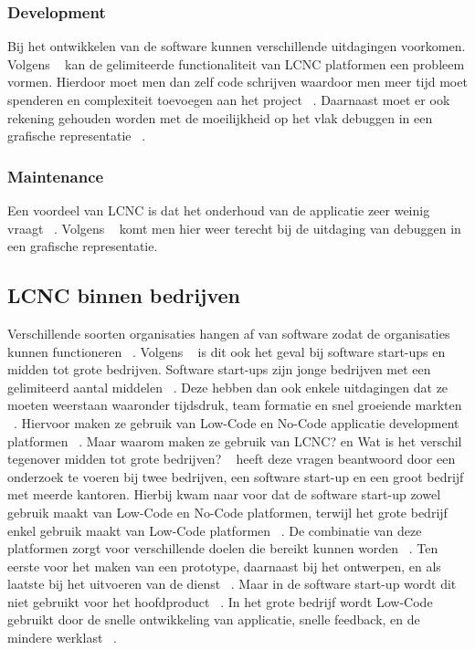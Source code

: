 \subsubsection*{Development}
\label{sub:development}
Bij het ontwikkelen van de software kunnen verschillende uitdagingen voorkomen.
Volgens ~\textcite{Rokis_2022} kan de gelimiteerde functionaliteit van LCNC platformen een probleem vormen.
Hierdoor moet men dan zelf code schrijven waardoor men meer tijd moet spenderen en complexiteit toevoegen aan het project ~\autocite{Rokis_2022}.
Daarnaast moet er ook rekening gehouden worden met de moeilijkheid op het vlak debuggen in een grafische representatie ~\autocite{Rokis_2022}.
\subsubsection*{Maintenance}
\label{sub:maintenance}
Een voordeel van LCNC is dat het onderhoud van de applicatie zeer weinig vraagt ~\autocite{Rokis_2022}.
Volgens ~\textcite{Rokis_2022} komt men hier weer terecht bij de uitdaging van debuggen in een grafische representatie.

\subsection*{LCNC binnen bedrijven}
\label{sub:lcnc-binnen-bedrijven}
Verschillende soorten organisaties hangen af van software zodat de organisaties kunnen functioneren ~\autocite{Hintsch2021}.
Volgens ~\textcite{Rafiq_2022} is dit ook het geval bij software start-ups en midden tot grote bedrijven. 
Software start-ups zijn jonge bedrijven met een gelimiteerd aantal middelen ~\autocite{Rafiq_2022}. 
Deze hebben dan ook enkele uitdagingen dat ze moeten weerstaan waaronder tijdsdruk, team formatie en snel groeiende markten ~\autocite{Rafiq_2022}.
Hiervoor maken ze gebruik van Low-Code en No-Code applicatie development platformen ~\autocite{Rafiq_2022}. 
Maar waarom maken ze gebruik van LCNC? en Wat is het verschil tegenover midden tot grote bedrijven?
~\textcite{Rafiq_2022} heeft deze vragen beantwoord door een onderzoek te voeren bij twee bedrijven, een software start-up en een groot bedrijf met meerde kantoren.
Hierbij kwam naar voor dat de software start-up zowel gebruik maakt van Low-Code en No-Code platformen, terwijl het grote bedrijf enkel gebruik maakt van Low-Code platformen ~\textcite{Rafiq_2022}.
De combinatie van deze platformen zorgt voor verschillende doelen die bereikt kunnen worden ~\autocite{Rafiq_2022}.
Ten eerste voor het maken van een prototype, daarnaast bij het ontwerpen, en als laatste bij het uitvoeren van de dienst ~\autocite{Rafiq_2022}.
Maar in de software start-up wordt dit niet gebruikt voor het hoofdproduct ~\autocite{Rafiq_2022}. In het grote bedrijf wordt Low-Code
gebruikt door de snelle ontwikkeling van applicatie, snelle feedback, en de mindere werklast ~\autocite{Rafiq_2022}.

